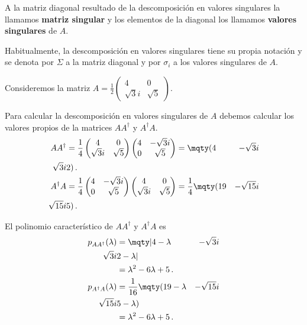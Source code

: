 \begin{defi}
  A la matriz diagonal resultado de la descomposición en valores singulares la llamamos \textbf{matriz singular} y los elementos de la diagonal los llamamos \textbf{valores singulares} de $A$.
\end{defi}

Habitualmente, la descomposición en valores singulares tiene su propia notación y se denota por $\Sigma$ a la matriz diagonal y por $\sigma_i$ a los valores singulares de $A$.

\begin{eje}
  Consideremos la matriz $A = \frac{1}{2}\begin{pmatrix} 4 & 0 \\ \sqrt{3}i & \sqrt{5} \end{pmatrix}$.

  Para calcular la descomposición en valores singulares de $A$ debemos calcular los valores propios de la matrices $AA^\dagger$ y $A^\dagger A$.
  \begin{align*}
    AA^\dagger  & = \frac{1}{4}\begin{pmatrix} 4 & 0 \\ \sqrt{3}i & \sqrt{5} \end{pmatrix}\begin{pmatrix} 4 & -\sqrt{3}i\\ 0 & \sqrt{5} \end{pmatrix} = \mqty(4             & -\sqrt{3}i  \\ \sqrt{3}i & 2)\,.               \\
    A^\dagger A & = \frac{1}{4}\begin{pmatrix} 4 & -\sqrt{3}i\\ 0 & \sqrt{5} \end{pmatrix}\begin{pmatrix} 4 & 0 \\ \sqrt{3}i & \sqrt{5} \end{pmatrix} = \frac{1}{4}\mqty(19 & -\sqrt{15}i \\ \sqrt{15}i & 5)\,.
  \end{align*}

  El polinomio característico de $AA^\dagger$ y $A^\dagger A$ es
  \begin{align*}
    p_{AA^\dagger}(\lambda)  & = \mqty|4-\lambda              & -\sqrt{3}i  \\ \sqrt{3}i & 2-\lambda| \\
                             & = \lambda^2-6\lambda+5\,.                    \\
    p_{A^\dagger A}(\lambda) & = \frac{1}{16}\mqty(19-\lambda & -\sqrt{15}i \\ \sqrt{15}i & 5-\lambda)\\
                             & = \lambda^2-6\lambda+5\,.
  \end{align*}


\end{eje}

